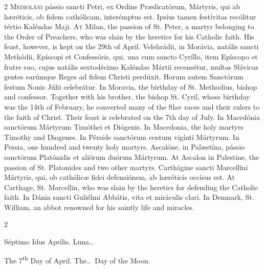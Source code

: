\begin{paracol}{2}
\lettrine[lines=2]{M}{edioláni} pássio sancti Petri, ex Ordine Prædicatórum, 
 Mártyris, qui ab hæréticis, ob fidem cathólicam, interémptus est. 
 Ipsíus tamen festívitas recólitur tértio Kaléndas Maji.
\switchcolumn
{}
\lettrine[lines=2]{A}{t} Milan, the passion of St. Peter, a martyr belonging to the Order of 
 Preachers, who was slain by the heretics for his Catholic faith. His 
 feast, however, is kept on the 29th of April.
\switchcolumn*
{}
Velehrádii, in Morávia, natális sancti Methódii, Epíscopi et Confessóris, 
 qui, una cum sancto Cyríllo, item Epíscopo et fratre suo, cujus natális 
 sextodécimo Kaléndas Mártii recensétur, multas Slávicas gentes earúmque 
 Reges ad fidem Christi perdúxit. Horum autem Sanctórum festum Nonis 
 Júlii celebrátur.
\switchcolumn
{}
In Moravia, the birthday of St. Methodius, bishop and confessor. 
 Together with his brother, the bishop St. Cyril, whose birthday was the 14th 
 of February, he converted many of the Slav races and their rulers to the 
 faith of Christ. Their feast is celebrated on the 7th day of July.
\switchcolumn*
{}
In Macedónia sanctórum Mártyrum Timóthei et Diógenis.
\switchcolumn
{}
In Macedonia, the holy martyrs Timothy and Diogenes.
\switchcolumn*
{}
In Pérside sanctórum centum vigínti Mártyrum.
\switchcolumn
{}
In Persia, one hundred and twenty holy martyrs.
\switchcolumn*
{}
Ascalóne, in Palæstína, pássio sanctórum 
 Platónidis et aliórum duórum Mártyrum.
\switchcolumn
{}
At Ascalon in Palestine, the passion of St. Platonides and two other 
 martyrs.
\switchcolumn*
{}
Carthágine sancti Marcellíni Mártyris, qui, ob cathólicæ 
 fidei defensiónem, ab hæréticis occísus est.
\switchcolumn
{}
At Carthage, St. Marcellin, who was slain by the heretics for defending the 
 Catholic faith.
\switchcolumn*
{}
In Dánia sancti Guliélmi Abbátis, vita et miráculis clari.
\switchcolumn
{}
In Denmark, St. William, an abbot renowned for his saintly life and 
 miracles.
\switchcolumn*
{}
\end{paracol}


\begin{paracol}{2}
\begin{center}{\color{gregoriocolor} Séptimo Idus Aprílis. 
 Luna\dots\ }\end{center}
\switchcolumn
{}
\begin{center}{\color{gregoriocolor} The 7\textsuperscript{th} Day of April. The\dots\ Day of the Moon.}\end{center}
\end{paracol}

